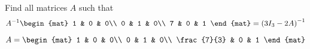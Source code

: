 
\begin{Exercise}[
name={},
title={}, 
difficulty=0,
origin={\cite{BS}}]
Find all matrices $A$ such that
\[
A^{-1}\begin{mat}
1 & 0 & 0\\
0 & 1 & 0\\
7 & 0 & 1
\end{mat}
=
\left(
3I_3
-2A
\right)^{-1}
\]
\end{Exercise}

\begin{Answer}
$
A=\begin{mat}
1 & 0 & 0\\
0 & 1 & 0\\
\frac{7}{3} & 0 & 1
\end{mat}
$
\end{Answer}
